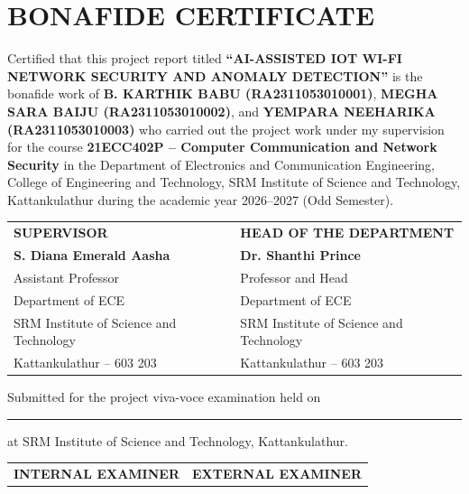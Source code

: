 \documentclass[11pt,a4paper]{report}
\begin{document}
\setcounter{page}{2}

\chapter*{BONAFIDE CERTIFICATE}
\thispagestyle{plain}

Certified that this project report titled \textbf{``AI-ASSISTED IOT WI-FI NETWORK SECURITY AND ANOMALY DETECTION''} is the bonafide work of \textbf{B. KARTHIK BABU (RA2311053010001)}, \textbf{MEGHA SARA BAIJU (RA2311053010002)}, and \textbf{YEMPARA NEEHARIKA (RA2311053010003)} who carried out the project work under my supervision for the course \textbf{21ECC402P -- Computer Communication and Network Security} in the Department of Electronics and Communication Engineering, College of Engineering and Technology, SRM Institute of Science and Technology, Kattankulathur during the academic year 2026--2027 (Odd Semester).

\vspace{2.2cm}

\noindent
\begin{tabular}{p{7.5cm}p{7.5cm}}
\textbf{SUPERVISOR} & \textbf{HEAD OF THE DEPARTMENT} \\[0.2cm]
\textbf{S. Diana Emerald Aasha} & \textbf{Dr. Shanthi Prince} \\
Assistant Professor & Professor and Head \\
Department of ECE & Department of ECE \\
SRM Institute of Science and Technology & SRM Institute of Science and Technology \\
Kattankulathur -- 603 203 & Kattankulathur -- 603 203 \\
\end{tabular}

\vspace{1.8cm}
\noindent
Submitted for the project viva-voce examination held on \rule{4cm}{0.4pt} at SRM Institute of Science and Technology, Kattankulathur.

\vspace{1.0cm}
\noindent
\begin{tabular}{p{7.5cm}p{7.5cm}}
\textbf{INTERNAL EXAMINER} & \textbf{EXTERNAL EXAMINER} \\
\end{tabular}
\end{document}
